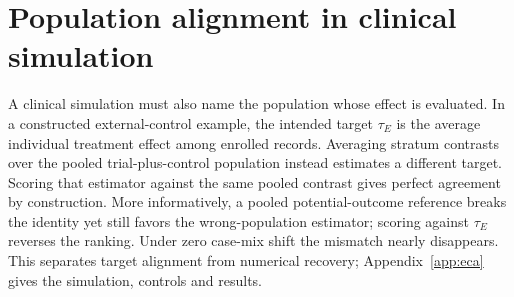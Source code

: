 \section{Population alignment in clinical simulation}
\label{sec:eca}
A clinical simulation must also name the population whose effect is evaluated.
In a constructed external-control example, the intended target $\tau_E$ is
the average individual treatment effect among enrolled records. Averaging
stratum contrasts over the pooled trial-plus-control population instead
estimates a different target. Scoring that estimator against the same pooled
contrast gives perfect agreement by construction. More informatively, a
pooled potential-outcome reference breaks the identity yet still favors the
wrong-population estimator; scoring against $\tau_E$ reverses the ranking.
Under zero case-mix shift the mismatch nearly disappears. This separates
target alignment from numerical recovery; Appendix~\ref{app:eca} gives the
simulation, controls and results.
